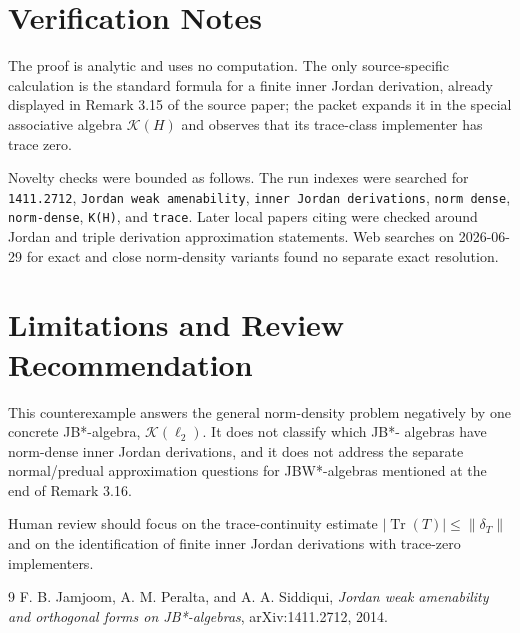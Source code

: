 \documentclass[11pt]{article}
\newcommand{\K}{\mathcal K}
\newcommand{\Tr}{\operatorname{Tr}}
\begin{document}
\section{Verification Notes}

The proof is analytic and uses no computation. The only source-specific
calculation is the standard formula for a finite inner Jordan derivation,
already displayed in Remark 3.15 of the source paper; the packet expands it
in the special associative algebra $\K(H)$ and observes that its trace-class
implementer has trace zero.

Novelty checks were bounded as follows. The run indexes were searched for
\texttt{1411.2712}, \texttt{Jordan weak amenability}, \texttt{inner Jordan
derivations}, \texttt{norm dense}, \texttt{norm-dense}, \texttt{K(H)}, and
\texttt{trace}. Later local papers citing \cite{JamjoomPeraltaSiddiqui} were
checked around Jordan and triple derivation approximation statements. Web
searches on 2026-06-29 for exact and close norm-density variants found no
separate exact resolution.

\section{Limitations and Review Recommendation}

This counterexample answers the general norm-density problem negatively by
one concrete JB*-algebra, $\K(\ell_2)$. It does not classify which JB*-
algebras have norm-dense inner Jordan derivations, and it does not address
the separate normal/predual approximation questions for JBW*-algebras
mentioned at the end of Remark 3.16.

Human review should focus on the trace-continuity estimate
$|\Tr(T)|\leq \|\delta_T\|$ and on the identification of finite inner Jordan
derivations with trace-zero implementers.

\begin{thebibliography}{9}
F. B. Jamjoom, A. M. Peralta, and A. A. Siddiqui,
\emph{Jordan weak amenability and orthogonal forms on JB*-algebras},
arXiv:1411.2712, 2014.
\end{thebibliography}
\end{document}
